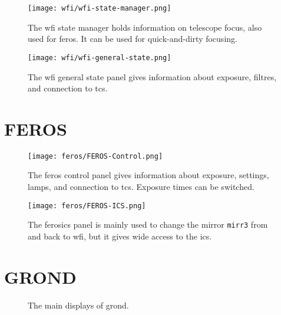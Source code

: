 \documentclass[11pt,fleqn,a4paper]{book}
\begin{document}
\begin{figure}[!ht]
\centering
\texttt{[image: wfi/wfi-state-manager.png]}
\caption[WFI state manager]{The \gls{wfi} \gls{state manager} holds information on telescope \gls{focus}, also used for \gls{feros}. It can be used for quick-and-dirty focusing.}
\label{fig:wfistate}
\end{figure}

\begin{figure}[!ht]
\centering
\texttt{[image: wfi/wfi-general-state.png]}
\caption[WFI \gls{General State} panel]{The \gls{wfi} general state panel gives information
about exposure, filtres, and connection to \gls{tcs}.}
\label{fig:wfigen}
\end{figure}

\section{FEROS}

\begin{figure}[!ht]
\centering
\texttt{[image: feros/FEROS-Control.png]}
\caption[FEROS control panel]{The \gls{feros} control panel gives information
about exposure, settings, lamps, and connection to \gls{tcs}.  Exposure times
can be switched.}
\label{fig:feroscon}
\end{figure}

\begin{figure}[!ht]
\centering
\texttt{[image: feros/FEROS-ICS.png]}
\caption[FEROS instrument control software panel]{The \gls{ferosics} panel is mainly used to change the mirror \texttt{\gls{mirr3}} from and back to \gls{wfi}, but it gives wide access to the \acrlong{ics}.}
\label{fig:ferosics}
\end{figure}


\section{GROND}

\begin{figure}[!ht]
\centering
{}\hfill
{}
\caption[The main displays of GROND]{The main displays of \gls{grond}.}
\label{fig:grondmain}
\end{figure}
\end{document}
